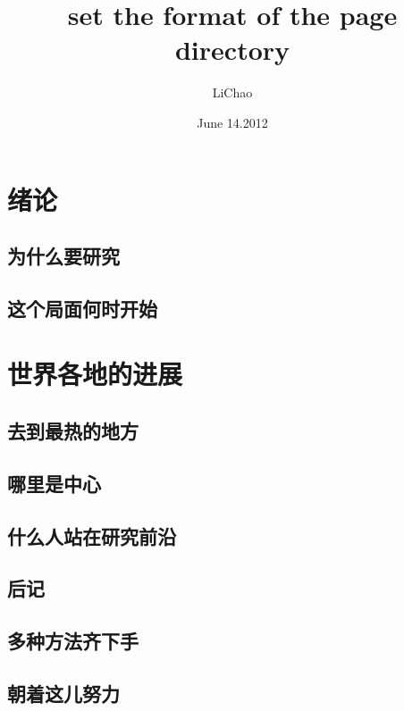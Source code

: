 \documentclass[UTF8]{ctexart}
\title{set the format of the page directory}
\author{LiChao}
\date{June 14.2012}
\begin{document}
\maketitle
\tableofcontents
\section{绪论}
\subsection{为什么要研究}
\vspace{10cm}
\subsection{这个局面何时开始}
\vspace{10cm}
\section{世界各地的进展}
\subsection{去到最热的地方}
\vspace{10cm}
\subsection{哪里是中心}
\vspace{10cm}
\subsection{什么人站在研究前沿}
\vspace{10cm}
\subsection{后记}
\subsection{多种方法齐下手}
\vspace{10cm}
\subsection{朝着这儿努力}
\vspace{10cm}
\end{document}
